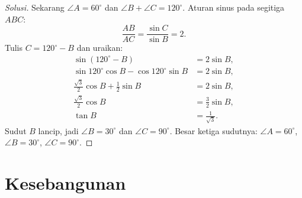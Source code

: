 \documentclass[12pt]{scrartcl}
\begin{document}
\begin{enumerate}[resume]
\begin{proof}[Solusi]
	Sekarang $\angle A = 60^\circ$ dan $\angle B + \angle C = 120^\circ$.
	Aturan sinus pada segitiga $ABC$:
	\[ \frac{AB}{AC} = \frac{\sin C}{\sin B} = 2. \]
	Tulis $C = 120^\circ - B$ dan uraikan:
	\begin{align*}
	\sin(120^\circ - B) &= 2\sin B, \\
	\sin 120^\circ\cos B - \cos 120^\circ\sin B &= 2\sin B, \\
	\frac{\sqrt{3}}{2}\cos B + \frac12\sin B &= 2\sin B, \\
	\frac{\sqrt{3}}{2}\cos B &= \frac32\sin B, \\
	\tan B &= \frac{1}{\sqrt{3}}.
	\end{align*}
	Sudut $B$ lancip, jadi $\angle B = 30^\circ$ dan
	$\angle C = 90^\circ$. Besar ketiga sudutnya:
	$\angle A = 60^\circ$, $\angle B = 30^\circ$,
	$\angle C = 90^\circ$.
	\end{proof}

\end{enumerate}

\section{Kesebangunan}
\end{document}
